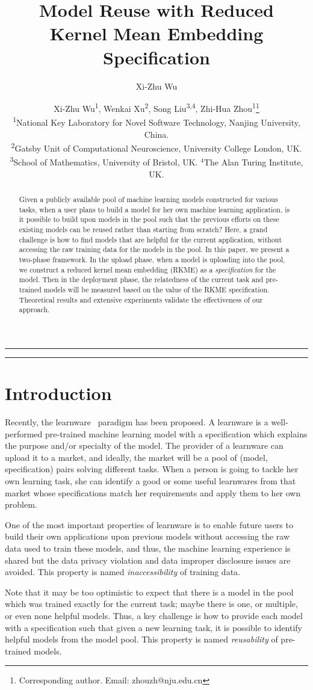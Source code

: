 \documentclass[paper=letter, fontsize=20pt]{article}
\title{\vspace{-7mm}\fontsize{20pt}{10pt}\selectfont\textbf{Model Reuse with Reduced \\ \vspace{1.2mm} Kernel Mean Embedding Specification}} \author{Xi-Zhu Wu}
\author{
Xi-Zhu Wu\textsuperscript{1}, Wenkai Xu\textsuperscript{2}, Song Liu\textsuperscript{3,4}, Zhi-Hua Zhou\textsuperscript{1}\thanks{Corresponding author. Email: zhouzh@nju.edu.cn}\\
\small
\textsuperscript{1}National Key Laboratory for Novel Software Technology, Nanjing University, China.\\
\small
\textsuperscript{2}Gatsby Unit of Computational Neuroscience, University College London, UK.\\
\small
\textsuperscript{3}School of Mathematics, University of Bristol, UK. $^4$The Alan Turing Institute, UK.
}
\date{}
\begin{document}
\maketitle

\hrule
\begin{abstract} 
Given a publicly available pool of machine learning models constructed for various tasks, when a user plans to build a model for her own machine learning application, is it possible to build upon models in the pool such that the previous efforts on these existing models can be reused rather than starting from scratch? Here, a grand challenge is how to find models that are helpful for the current application, without accessing the raw training data for the models in the pool. In this paper, we present a two-phase framework. In the upload phase, when a model is uploading into the pool, we construct a reduced kernel mean embedding (RKME) as a \emph{specification} for the model. Then in the deployment phase, the relatedness of the current task and pre-trained models will be measured based on the value of the RKME specification. Theoretical results and extensive experiments validate the effectiveness of our approach.
\end{abstract} 
\hrule
\section{Introduction}
Recently, the learnware~\citep{learnware} paradigm has been proposed. A learnware is a well-performed pre-trained machine learning model with a specification which explains the purpose and/or specialty of the model. The provider of a learnware can upload it to a market, and ideally, the market will be a pool of (model, specification) pairs solving different tasks. When a person is going to tackle her own learning task, she can identify a good or some useful learnwares from that market whose specifications match her requirements and apply them to her own problem.

One of the most important properties of learnware is to enable future users to build their own applications upon previous models without accessing the raw data used to train these models, and thus, the machine learning experience is shared but the data privacy violation and data improper disclosure issues are avoided. This property is named \emph{inaccessibility} of training data.

Note that it may be too optimistic to expect that there is a model in the pool which was trained exactly for the current task; maybe there is one, or multiple, or even none helpful models. Thus, a key challenge is how to provide each model with a specification such that given a new learning task, it is possible to identify helpful models from the model pool. This property is named \emph{reusability} of pre-trained models.
\end{document}
